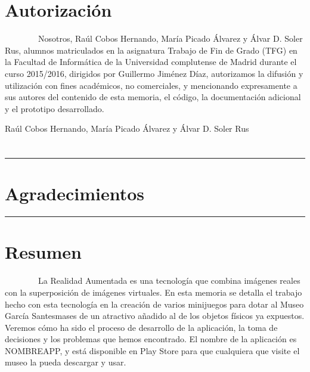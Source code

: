 \documentclass[]{article}
\begin{document}
\section{Autorización}\label{h.dq7ahit8sjpf}

~~~~~~~~Nosotros, Raúl Cobos Hernando, María Picado Álvarez y Álvar D.
Soler Rus, alumnos matriculados en la asignatura Trabajo de Fin de Grado
(TFG) en la Facultad de Informática de la Universidad complutense de
Madrid durante el curso 2015/2016, dirigidos por Guillermo Jiménez Díaz,
autorizamos la difusión y utilización con fines académicos, no
comerciales, y mencionando expresamente a sus autores del contenido de
esta memoria, el código, la documentación adicional y el prototipo
desarrollado.

Raúl Cobos Hernando, María Picado Álvarez y Álvar D. Soler Rus

\section{}\label{h.i17pqbm23uz3}

\begin{center}\rule{3in}{0.4pt}\end{center}

\section{}\label{h.8vit5zt1sh8v}

\section{Agradecimientos}\label{h.l576qby6rf7i}

\begin{center}\rule{3in}{0.4pt}\end{center}

\section{}\label{h.1dq7twhfep2p}

\section{Resumen}\label{h.a9b04t74nw7y}

~~~~~~~~La Realidad Aumentada es una tecnología que combina imágenes
reales con la superposición de imágenes virtuales. En esta memoria se
detalla el trabajo hecho con esta tecnología en la creación de varios
minijuegos para dotar al Museo García Santesmases de un atractivo
añadido al de los objetos físicos ya expuestos. Veremos cómo ha sido el
proceso de desarrollo de la aplicación, la toma de decisiones y los
problemas que hemos encontrado. El nombre de la aplicación es NOMBREAPP,
y está disponible en Play Store para que cualquiera que visite el museo
la pueda descargar y usar.
\end{document}
